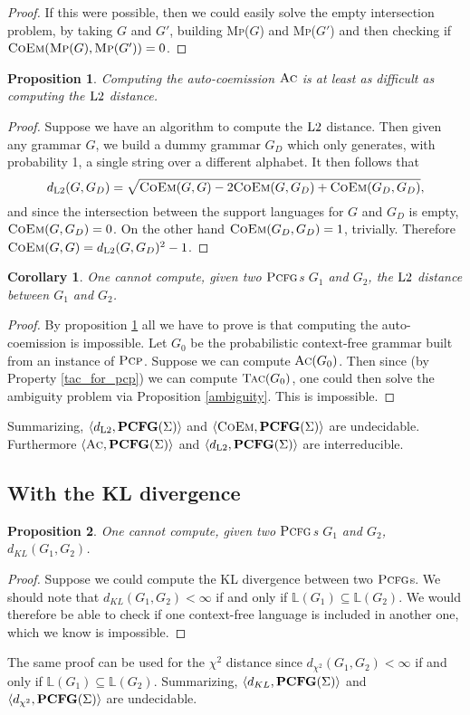 \documentclass[submission]{eptcs} \usepackage{breakurl}             \usepackage[english]{babel}
\newtheorem{proposition}{Proposition}
\newtheorem{corollary}{Corollary}
\providecommand{\PCFGclass}{\textup{\textbf{PCFG}(\ensuremath{\Sigma})}}
\providecommand{\Ltwo}{\textup{L2}}
\providecommand{\PCFG}{\ensuremath{\textsc{Pcfg}}}
\providecommand{\AC}{\ensuremath{\textsc{Ac}}}
\providecommand{\TAC}{\ensuremath{\textsc{Tac}}}
\providecommand{\PCP}{\ensuremath{\textsc{Pcp}}}
\providecommand{\Naming}{\ensuremath{\mathbb L}}
\providecommand{\COEM}{\ensuremath{\textsc{CoEm}}}
\begin{document}
\begin{proof} If this were possible, then we could easily solve the empty intersection problem, by taking $G$ and $G'$, building  \textsc{Mp}($G$) and \textsc{Mp}($G'$) and then checking if $\COEM(\mbox{\textsc{Mp}}(G),\mbox{\textsc{Mp}}(G'))=0$.
\end{proof}
\begin{proposition}\label{coemd2reduction}
Computing the auto-coemission $\AC$ is at least as difficult as computing the $\Ltwo$ distance.
\end{proposition}
\begin{proof}
Suppose we have an algorithm to compute the $\Ltwo$ distance. Then given any grammar $G$, we build a dummy grammar $G_D$ which only generates, with probability 1, a single string over a different alphabet. It then follows that
$$d_{\Ltwo}(G,G_D)=\sqrt{\COEM(G,G)-2\COEM(G,G_D)+\COEM(G_D,G_D)},$$
and since the intersection between the support languages for $G$ and $G_D$ is empty, $\COEM(G,G_D)=0$. On the other hand $\COEM(G_D,G_D)=1$, trivially.
Therefore $\COEM(G,G)=d_{\Ltwo}(G,G_D)^2-1$.
\end{proof}

\begin{corollary}
One cannot compute, given two $\PCFG$s $G_1$ and $G_2$, the $\Ltwo$ distance between $G_1$ and $G_2$.
\end{corollary}
\begin{proof}
By proposition \ref{coemd2reduction} all we have to prove is that computing the auto-coemission is impossible.
Let $G_0$ be the probabilistic context-free grammar built from an instance of $\PCP$. Suppose we can compute $\AC(G_0)$. Then since (by Property \ref{tac_for_pcp}) we can compute $\TAC(G_0)$, one could then solve the ambiguity problem via Proposition \ref{ambiguity}. This is impossible.
\end{proof}
Summarizing, $\langle d_{\Ltwo},\PCFGclass\rangle$ and $\langle \COEM,\PCFGclass\rangle$ are undecidable. Furthermore $\langle \AC,\PCFGclass\rangle$ and $\langle d_{\Ltwo},\PCFGclass\rangle$ are interreducible.


\subsection{With the KL divergence}
\begin{proposition}
One cannot compute, given two $\PCFG$s $G_1$ and $G_2$, $d_{KL}(G_1,G_2)$.
\end{proposition}
\begin{proof}
Suppose we could compute the KL divergence between two $\PCFG$s. We should note that $d_{KL}(G_1,G_2)<\infty$ if and only if $\Naming(G_1)\subseteq \Naming(G_2)$. We would therefore be able to check if one context-free language is included in another one, which we know is impossible.
\end{proof}
The same proof can be used for the $\chi^2$ distance since $d_{\chi^2}(G_1,G_2)<\infty$ if and only if $\Naming(G_1)\subseteq \Naming(G_2)$. Summarizing, $\langle d_{KL},\PCFGclass\rangle$ and $\langle d_{\chi^2},\PCFGclass\rangle$ are undecidable.
\end{document}
